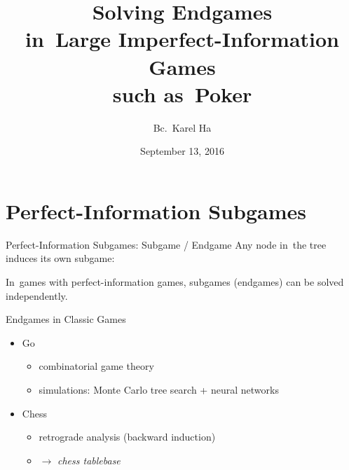 \documentclass{beamer}
\title{Solving Endgames \\in~Large Imperfect-Information Games \\such as~Poker}
\date{September 13, 2016}
\author{Bc.~Karel Ha}
\institute{Department of~Applied Mathematics \\Charles University}
\theoremstyle{definition}
\begin{document}
  {
    \maketitle
  }

  \section{Perfect-Information Subgames}

  \begin{frame}{Perfect-Information Subgames: Subgame / Endgame}
    Any node in~the tree induces its own subgame:
    \pause
    \begin{figure}[H]
      \raggedleft
      \scriptsize
      \def\svgwidth{.8\textwidth}
      
    \end{figure}
    \pause

    In~games with perfect-information games, subgames (endgames) can be solved independently.
  \end{frame}

  \begin{frame}{Endgames in Classic Games}
    \pause
    \begin{itemize}[<+- | alert@+>]
      \item Go
        \begin{itemize}
          \item combinatorial game theory
          \item simulations: Monte Carlo tree search + neural networks
        \end{itemize}
      \item Chess
        \begin{itemize}
          \item retrograde analysis (backward induction)
          \item $\to$ \emph{chess tablebase}
        \end{itemize}
    \end{itemize}
  \end{frame}
\end{document}
